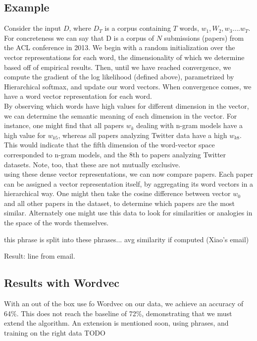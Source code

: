 \documentclass[conference]{IEEEtran}
\begin{document}
\subsection{Example}
Consider the input $D$, where $D_T$ is a corpus containing $T$ words, $w_1, W_2, w_3 .... w_T$. For concreteness we can say that D is a corpus of $N$ submissions (papers) from the ACL conference in 2013. We begin with a random initialization over the vector representations for each word, the dimensionality of which we determine based off of empirical results. Then, until we have reached convergence, we compute the gradient of the log likelihood (defined above), parametrized by Hierarchical softmax, and update our word vectors. When convergence comes, we have a word vector representation for each word.
\\ By observing which words have high values for different dimension in the vector, we can determine the semantic meaning of each dimension in the vector. For instance, one might find that all papers $w_k$ dealing with n-gram models have a high value for $w_{k5}$, whereas all papers analyzing Twitter data have a high $w_{k8}$. This would indicate that the fifth dimension of the word-vector space corresponded to n-gram models, and the 8th to papers analyzing Twitter datasets. Note, too, that these are not mutually exclusive.
\\using these dense vector representations, we can now compare papers. Each paper can be assigned a vector representation itself, by aggregating its word vectors in a hierarchical way. One might then take the cosine difference between vector $w_0$ and all other papers in the dataset, to determine which papers are the most similar. Alternately one might use this data to look for similarities or analogies in the space of the words themselves.

this phrase is split into these phrases... avg similarity if computed (Xiao's email)

Result: line from email.

\subsection{Results with Wordvec}
With an out of the box use fo Wordvec on our data, we achieve an accuracy of 64\%. This does not reach the baseline of 72\%, demonstrating that we must extend the algorithm. An extension is mentioned soon, using phrases, and training on the right data TODO\\
\end{document}
